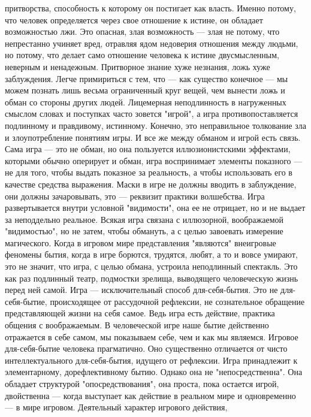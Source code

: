 \documentclass[12pt]{article}
\begin{document}
притворства, способность к которому он постигает как власть. Именно потому, что человек определяется через
свое отношение к истине, он обладает возможностью лжи. Это опасная, злая возможность --- злая не потому, что
непрестанно учиняет вред, отравляя ядом недоверия отношения между людьми, но потому, что делает само
отношение человека к истине двусмысленным, неверным и ненадежным. Притворное знание хуже незнания,
ложь хуже заблуждения. Легче примириться с тем, что --- как существо конечное --- мы можем познать лишь
весьма  ограниченный  круг  вещей,  чем  вынести  ложь  и  обман  со  стороны  других  людей.  Лицемерная
неподлинность в нагруженных смыслом словах и поступках часто зовется "игрой", а игра противопоставляется
подлинному и правдивому, истинному. Конечно, это неправильное толкование зла и злоупотребление понятиям
игры.  И  все  же  между  обманом  и  игрой  есть  связь.  Сама  игра  ---  это  не  обман,  но  она  пользуется
иллюзионистскими эффектами, которыми обычно оперирует и обман, игра воспринимает элементы показного ---не для того, чтобы выдать показное за реальность, а чтобы использовать его в качестве средства выражения.
Маски  в  игре  не  должны  вводить  в  заблуждение,  они  должны  зачаровывать,  это  ---  реквизит  практики 
волшебства.  Игра  развертывается  внутри  условной  "видимости",  она  ее  не  отрицает,  но  и  не  выдает  за
неподдельно реальное. Всякая игра связана с иллюзорной, воображаемой "видимостью", но не затем, чтобы
обмануть,  а  с  целью  завоевать  измерение  магического.  Когда  в  игровом  мире  представления  "являются"
внеигровые феномены бытия, когда в игре борются, трудятся, любят, а то и вовсе умирают, это не значит, что
игра, с целью обмана, устроила неподлинный спектакль. Это как раз подлинный театр, подмостки зрелища,
выводящего человеческую жизнь перед ней самой. Игра --- исключительный способ для-себя-бытия. Это не для-себя-бытие, происходящее от рассудочной рефлексии, не сознательное обращение представляющей жизни на
себя самое. Ведь игра есть действие, практика общения с воображаемым. В человеческой игре наше бытие
действенно отражается в себе самом, мы показываем себе, чем и как мы являемся. Игровое для-себя-бытие
человека прагматично. Оно существенно отличается от чисто интеллектуального для-себя-бытия, идущего от
рефлексии. Игра принадлежит к элементарному, дорефлективному бытию. Однако она не "непосредственна".
Она обладает структурой "опосредствования", она проста, пока остается игрой, двойственна --- когда выступает
как действие в реальном мире и одновременно --- в мире игровом. Деятельный характер игрового действия,
\end{document}
